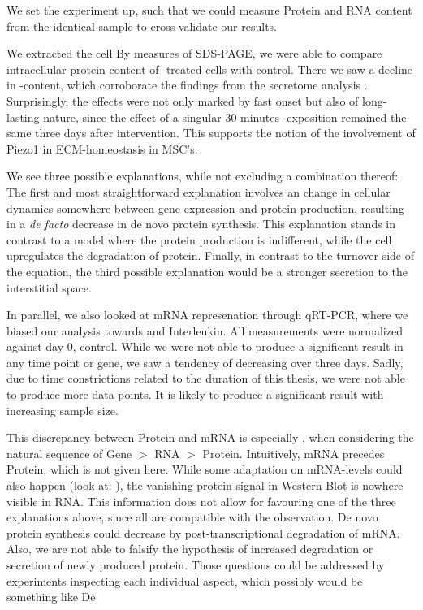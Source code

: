 We set the experiment up, such that we could measure Protein and RNA content from the identical sample to cross-validate our results.  

We extracted the cell By measures of SDS-PAGE, we were able to compare intracellular protein content of \Yoda-treated cells with control. There we saw a  decline in \colone-content, which corroborate the findings from the secretome analysis . Surprisingly, the effects were not only marked by fast onset but also of long-lasting nature, since the effect of a singular 30 minutes \Yoda-exposition remained the same three days after intervention. This supports the notion of the involvement of Piezo1 in ECM-homeostasis in MSC's. \par

We see three possible explanations, while not excluding a combination thereof: The first and most straightforward explanation involves an change in cellular dynamics somewhere between gene expression and protein production, resulting in a \textit{de facto} decrease in de novo protein synthesis. This explanation stands in contrast to a model where the protein production is indifferent, while the cell upregulates the degradation of protein. Finally, in contrast to the turnover side of the equation, the third possible explanation would be a stronger secretion to the interstitial space.

In parallel, we also looked at mRNA represenation through qRT-PCR, where we biased our analysis towards %
and Interleukin.  All measurements were normalized against day 0, control. While we were not able to produce a significant result in any time point or gene, we saw a tendency of decreasing \colone over three days. Sadly, due to time constrictions related to the duration of this thesis, we were not able to produce more data points. It is likely to produce a significant result with increasing sample size. 

This discrepancy between Protein and mRNA is especially , when considering the natural sequence of Gene $>$ RNA $>$ Protein. Intuitively, mRNA precedes Protein, which is not given here. While some adaptation on mRNA-levels could also happen (look at:  \colone), the vanishing protein signal in Western Blot is nowhere visible in RNA. This information does not allow for favouring one of the three explanations above, since all are compatible with the observation. De novo protein synthesis could decrease by post-transcriptional degradation of mRNA. Also, we are not able to falsify the hypothesis of increased degradation or secretion of newly produced protein. Those questions could be addressed by experiments inspecting each individual aspect, which possibly would be something like De 

